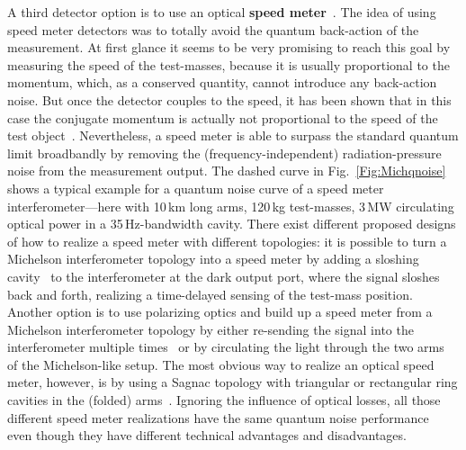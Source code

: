 A third detector option is to use an optical {\bf speed
meter}~\cite{Khalili1996}. The idea of using speed meter detectors
was to totally avoid the quantum back-action of the measurement.
At first glance it seems to be very promising to reach this goal
by measuring the speed of the test-masses, because it is usually
proportional to the momentum, which, as a conserved quantity,
cannot introduce any back-action noise. But once the detector
couples to the speed, it has been shown that in this case the
conjugate momentum is actually not proportional to
the speed of the test object~\cite{Khalili2002}. Nevertheless, a speed
meter is able to surpass the standard quantum limit broadbandly by
removing the (frequency-independent) radiation-pressure noise from
the measurement output. The dashed curve in
Fig.~\ref{Fig:Michqnoise} shows a typical example for a quantum
noise curve of a speed meter interferometer---here with 10\,km
long arms, 120\,kg test-masses, 3\,MW circulating optical power in
a 35\,Hz-bandwidth cavity. There exist different proposed designs
of how to realize a speed meter with different topologies: it is
possible to turn a Michelson interferometer topology into a speed
meter by adding a sloshing cavity~\cite{Purdue2002,Purdue2002a} to
the interferometer at the dark output port, where the signal
sloshes back and forth, realizing a time-delayed sensing of the
test-mass position. Another option is to use polarizing optics and
build up a speed meter from a Michelson interferometer topology by
either re-sending the signal into the interferometer multiple
times~\cite{McKenzie2008} or by circulating the light through the
two arms~\cite{Danilishin2004} of the Michelson-like setup. The
most obvious way to realize an optical speed meter, however, is by
using a Sagnac topology with
triangular or rectangular ring cavities in the (folded)
arms~\cite{Chen2003,Mueller-Ebhardt2009a,Eberle2010}. Ignoring the
influence of optical losses, all those different speed meter
realizations have the same quantum noise
performance~\cite{Chen2003} even though they have different
technical advantages and disadvantages.
%
